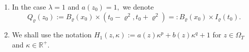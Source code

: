 \documentclass[11pt,oneside, english,reqno,twoside a4paper]{amsart}
\theoremstyle{definition}
\numberwithin{theorem}{section}
\numberwithin{equation}{section}
\newcommand{\la}{\lambda}
\newcommand{ \mr }{ \mathbb{R} }
\begin{document}
\begin{enumerate}[label=(\roman*),series=theoremconditions]
\noindent The notation $Q_{\varrho, \lambda}(z_0)$ is used to denote $p$-intrinsic cylinders at $z_0=(x_0, t_0),$
\begin{align*}
Q_{\varrho, \lambda}(z_0):=B_{\varrho}(x_0)\times \left(t_0-\frac{\lambda^{2-p}\varrho^2}{a(z_0)}, t_0+\frac{\lambda^{2-p}\varrho^2}{a(z_0)}\right)
=:B_{\varrho}(x_0)\times I_{\varrho, \lambda}(t_0).
\end{align*}
The notation $J_{\varrho, \lambda}(z_0)$ is used to denote $q$-intrinsic cylinders at $z_0=(x_0, t_0),$
\begin{align*}
J_{\varrho, \lambda}(z_0):=B_{\varrho}(x_0)\times \left(t_0-\frac{\lambda^{2-q}\varrho^2}{b(z_0)}, t_0+\frac{\lambda^{2-q}\varrho^2}{b(z_0)}\right)
=:B_{\varrho}(x_0)\times I^q_{\varrho, \lambda}(t_0).
\end{align*}
The notation $G_{\varrho, \lambda}(z_0)$ is used to denote $(p,q)$-intrinsic cylinders at $z_0=(x_0, t_0),$
\begin{align*}
G_{\varrho, \lambda}(z_0):=B_{\varrho}(x_0)\times \left(t_0-\frac{\lambda^{2}\varrho^2}{\Lambda}, t_0+\frac{\lambda^{2}\varrho^2}{\Lambda}\right)
=:B_{\varrho}(x_0)\times I^{(p,q)}_{\varrho, \lambda}(t_0),
\end{align*}
where $\Lambda:=a(z_0)\lambda^p+b(z_0)\lambda^q.$
\item \label{not5.5} In the case $\la =1$ and $a(z_0)=1,$ we denote 
\[
Q_\varrho(z_0) := B_{\varrho}(x_0) \times (t_0 - \varrho^2,t_0+\varrho^2) =: B_\varrho(x_0) \times I_\varrho(t_0).
\]
\item\label{not6} We shall use the notation $H_1(z,\kappa) := a(z) \kappa^p + b(z) \kappa^q + 1$ for $z \in \Omega_T$ and $\kappa\in\mr^+$.


\end{enumerate}
\end{document}
